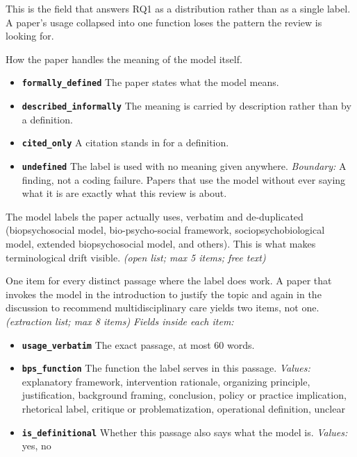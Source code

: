 \documentclass[11pt]{article}
\begin{document}
\begin{description}
{\small This is the field that answers RQ1 as a distribution rather than as a single label. A paper's usage collapsed into one function loses the pattern the review is looking for.}
\item[\texttt{bps\_definition\_status}] How the paper handles the meaning of the model itself.
  \begin{itemize}[leftmargin=1.3em,itemsep=2pt,topsep=2pt]
  \item \textbf{\texttt{formally\_defined}} The paper states what the model means.
  \item \textbf{\texttt{described\_informally}} The meaning is carried by description rather than by a definition.
  \item \textbf{\texttt{cited\_only}} A citation stands in for a definition.
  \item \textbf{\texttt{undefined}} The label is used with no meaning given anywhere. {\small \textit{Boundary:} A finding, not a coding failure. Papers that use the model without ever saying what it is are exactly what this review is about.}
  \end{itemize}
\item[\texttt{bps\_model\_variants}] The model labels the paper actually uses, verbatim and de-duplicated (biopsychosocial model, bio-psycho-social framework, sociopsychobiological model, extended biopsychosocial model, and others). This is what makes terminological drift visible. \textit{(open list; max 5 items; free text)}
\item[\texttt{bps\_usage\_instances}] One item for every distinct passage where the label does work. A paper that invokes the model in the introduction to justify the topic and again in the discussion to recommend multidisciplinary care yields two items, not one. \textit{(extraction list; max 8 items)}
  {\small\itshape Fields inside each item:}
  \begin{itemize}[leftmargin=1.3em,itemsep=1pt,topsep=2pt]
  \item \textbf{\texttt{usage\_verbatim}} The exact passage, at most 60 words.
  \item \textbf{\texttt{bps\_function}} The function the label serves in this passage. {\small \textit{Values:} explanatory framework, intervention rationale, organizing principle, justification, background framing, conclusion, policy or practice implication, rhetorical label, critique or problematization, operational definition, unclear}
  \item \textbf{\texttt{is\_definitional}} Whether this passage also says what the model is. {\small \textit{Values:} yes, no}

\end{itemize}
\end{description}
\end{document}

